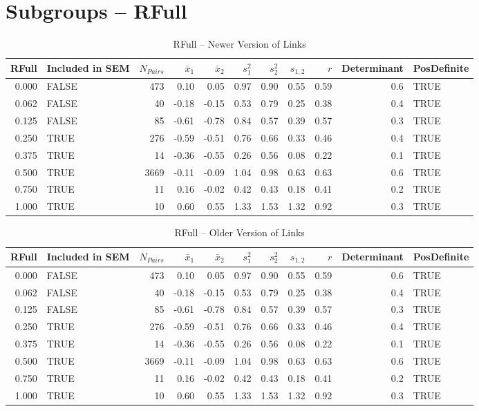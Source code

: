 \documentclass{article}\usepackage[]{graphicx}\usepackage[]{color}
\begin{document}
\section{Subgroups --  RFull }%
\begin{table}[ht]
\centering
\begin{tabular}{rlrrrrrrrrl}
  \hline
RFull & Included in SEM & $N_{Pairs}$ & $\bar{x}_1$ & $\bar{x}_2$ & $s_1^2$ & $s_2^2$ & $s_{1,2}$ & $r$ & Determinant & PosDefinite \\ 
  \hline
0.000 & FALSE & 473 & 0.10 & 0.05 & 0.97 & 0.90 & 0.55 & 0.59 & 0.6 & TRUE \\ 
  0.062 & FALSE & 40 & -0.18 & -0.15 & 0.53 & 0.79 & 0.25 & 0.38 & 0.4 & TRUE \\ 
  0.125 & FALSE & 85 & -0.61 & -0.78 & 0.84 & 0.57 & 0.39 & 0.57 & 0.3 & TRUE \\ 
  0.250 & TRUE & 276 & -0.59 & -0.51 & 0.76 & 0.66 & 0.33 & 0.46 & 0.4 & TRUE \\ 
  0.375 & TRUE & 14 & -0.36 & -0.55 & 0.26 & 0.56 & 0.08 & 0.22 & 0.1 & TRUE \\ 
  0.500 & TRUE & 3669 & -0.11 & -0.09 & 1.04 & 0.98 & 0.63 & 0.63 & 0.6 & TRUE \\ 
  0.750 & TRUE & 11 & 0.16 & -0.02 & 0.42 & 0.43 & 0.18 & 0.41 & 0.2 & TRUE \\ 
  1.000 & TRUE & 10 & 0.60 & 0.55 & 1.33 & 1.53 & 1.32 & 0.92 & 0.3 & TRUE \\ 
   \hline
\end{tabular}
\caption{RFull -- Newer Version of Links} 
\end{table}
\begin{table}[ht]
\centering
\begin{tabular}{rlrrrrrrrrl}
  \hline
RFull & Included in SEM & $N_{Pairs}$ & $\bar{x}_1$ & $\bar{x}_2$ & $s_1^2$ & $s_2^2$ & $s_{1,2}$ & $r$ & Determinant & PosDefinite \\ 
  \hline
0.000 & FALSE & 473 & 0.10 & 0.05 & 0.97 & 0.90 & 0.55 & 0.59 & 0.6 & TRUE \\ 
  0.062 & FALSE & 40 & -0.18 & -0.15 & 0.53 & 0.79 & 0.25 & 0.38 & 0.4 & TRUE \\ 
  0.125 & FALSE & 85 & -0.61 & -0.78 & 0.84 & 0.57 & 0.39 & 0.57 & 0.3 & TRUE \\ 
  0.250 & TRUE & 276 & -0.59 & -0.51 & 0.76 & 0.66 & 0.33 & 0.46 & 0.4 & TRUE \\ 
  0.375 & TRUE & 14 & -0.36 & -0.55 & 0.26 & 0.56 & 0.08 & 0.22 & 0.1 & TRUE \\ 
  0.500 & TRUE & 3669 & -0.11 & -0.09 & 1.04 & 0.98 & 0.63 & 0.63 & 0.6 & TRUE \\ 
  0.750 & TRUE & 11 & 0.16 & -0.02 & 0.42 & 0.43 & 0.18 & 0.41 & 0.2 & TRUE \\ 
  1.000 & TRUE & 10 & 0.60 & 0.55 & 1.33 & 1.53 & 1.32 & 0.92 & 0.3 & TRUE \\ 
   \hline
\end{tabular}
\caption{RFull -- Older Version of Links} 
\end{table}
\end{document}
